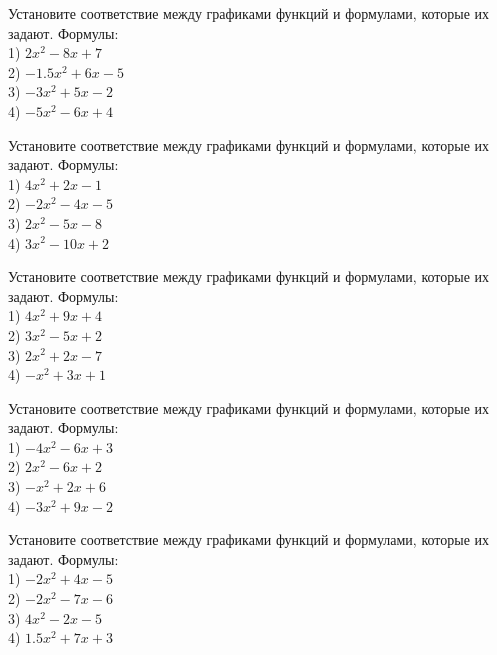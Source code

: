 \documentclass[4apaper]{article}
\begin{document}
\begin{taskBN}{52}
Установите соответствие между графиками функций и формулами, которые их задают. Формулы: \\1) $2x^2-8x+7$\\2) $-1.5x^2+6x-5$\\3) $-3x^2+5x-2$\\4) $-5x^2-6x+4$
\end{taskBN}

\begin{taskBN}{53}
Установите соответствие между графиками функций и формулами, которые их задают. Формулы: \\1) $4x^2+2x-1$\\2) $-2x^2-4x-5$\\3) $2x^2-5x-8$\\4) $3x^2-10x+2$
\end{taskBN}

\begin{taskBN}{54}
Установите соответствие между графиками функций и формулами, которые их задают. Формулы: \\1) $4x^2+9x+4$\\2) $3x^2-5x+2$\\3) $2x^2+2x-7$\\4) $-x^2+3x+1$
\end{taskBN}

\begin{taskBN}{55}
Установите соответствие между графиками функций и формулами, которые их задают. Формулы: \\1) $-4x^2-6x+3$\\2) $2x^2-6x+2$\\3) $-x^2+2x+6$\\4) $-3x^2+9x-2$
\end{taskBN}

\begin{taskBN}{56}
Установите соответствие между графиками функций и формулами, которые их задают. Формулы: \\1) $-2x^2+4x-5$\\2) $-2x^2-7x-6$\\3) $4x^2-2x-5$\\4) $1.5x^2+7x+3$
\end{taskBN}
\end{document}
